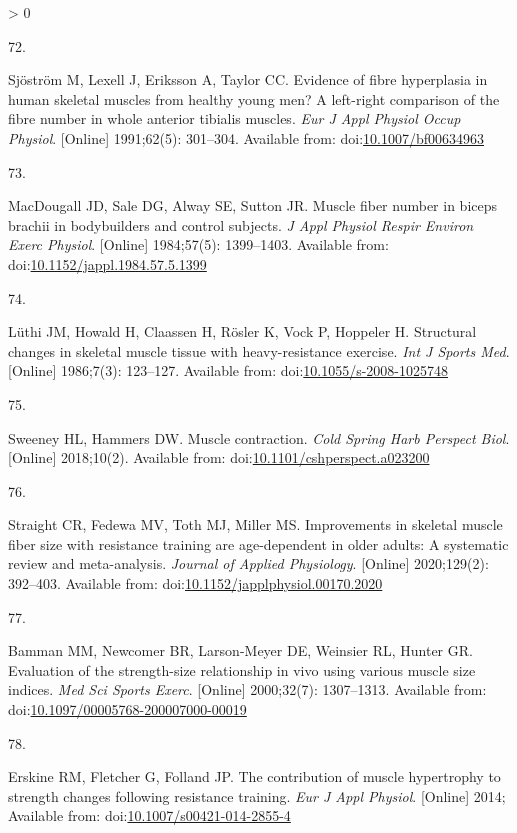 \documentclass[twoside,10pt]{gihclass} %
\newlength{\cslhangindent}
\newlength{\csllabelwidth}
\newenvironment{CSLReferences}[3] %
 {%
  \setlength{\parindent}{0pt}
  \ifodd #1 \everypar{\setlength{\hangindent}{\cslhangindent}}\ignorespaces\fi
  \ifnum #2 > 0
  \setlength{\parskip}{#2\baselineskip}
  \fi
 }%
 {}
\newcommand{\CSLLeftMargin}[1]{\parbox[t]{\maxof{\widthof{#1}}{\csllabelwidth}}{#1}}
\newcommand{\CSLRightInline}[1]{\parbox[t]{\linewidth}{#1}}
\begin{document}
\begin{CSLReferences}{0}{0}
\leavevmode\hypertarget{ref-RN2742}{}%
\CSLLeftMargin{72. }
\CSLRightInline{Sjöström M, Lexell J, Eriksson A, Taylor CC. Evidence of fibre hyperplasia in human skeletal muscles from healthy young men? A left-right comparison of the fibre number in whole anterior tibialis muscles. \emph{Eur J Appl Physiol Occup Physiol}. {[}Online{]} 1991;62(5): 301--304. Available from: doi:\href{https://doi.org/10.1007/bf00634963}{10.1007/bf00634963}}

\leavevmode\hypertarget{ref-RN2754}{}%
\CSLLeftMargin{73. }
\CSLRightInline{MacDougall JD, Sale DG, Alway SE, Sutton JR. Muscle fiber number in biceps brachii in bodybuilders and control subjects. \emph{J Appl Physiol Respir Environ Exerc Physiol}. {[}Online{]} 1984;57(5): 1399--1403. Available from: doi:\href{https://doi.org/10.1152/jappl.1984.57.5.1399}{10.1152/jappl.1984.57.5.1399}}

\leavevmode\hypertarget{ref-RN2731}{}%
\CSLLeftMargin{74. }
\CSLRightInline{Lüthi JM, Howald H, Claassen H, Rösler K, Vock P, Hoppeler H. Structural changes in skeletal muscle tissue with heavy-resistance exercise. \emph{Int J Sports Med}. {[}Online{]} 1986;7(3): 123--127. Available from: doi:\href{https://doi.org/10.1055/s-2008-1025748}{10.1055/s-2008-1025748}}

\leavevmode\hypertarget{ref-RN2756}{}%
\CSLLeftMargin{75. }
\CSLRightInline{Sweeney HL, Hammers DW. Muscle contraction. \emph{Cold Spring Harb Perspect Biol}. {[}Online{]} 2018;10(2). Available from: doi:\href{https://doi.org/10.1101/cshperspect.a023200}{10.1101/cshperspect.a023200}}

\leavevmode\hypertarget{ref-RN2669}{}%
\CSLLeftMargin{76. }
\CSLRightInline{Straight CR, Fedewa MV, Toth MJ, Miller MS. Improvements in skeletal muscle fiber size with resistance training are age-dependent in older adults: A systematic review and meta-analysis. \emph{Journal of Applied Physiology}. {[}Online{]} 2020;129(2): 392--403. Available from: doi:\href{https://doi.org/10.1152/japplphysiol.00170.2020}{10.1152/japplphysiol.00170.2020}}

\leavevmode\hypertarget{ref-RN2758}{}%
\CSLLeftMargin{77. }
\CSLRightInline{Bamman MM, Newcomer BR, Larson-Meyer DE, Weinsier RL, Hunter GR. Evaluation of the strength-size relationship in vivo using various muscle size indices. \emph{Med Sci Sports Exerc}. {[}Online{]} 2000;32(7): 1307--1313. Available from: doi:\href{https://doi.org/10.1097/00005768-200007000-00019}{10.1097/00005768-200007000-00019}}

\leavevmode\hypertarget{ref-RN1142}{}%
\CSLLeftMargin{78. }
\CSLRightInline{Erskine RM, Fletcher G, Folland JP. The contribution of muscle hypertrophy to strength changes following resistance training. \emph{Eur J Appl Physiol}. {[}Online{]} 2014; Available from: doi:\href{https://doi.org/10.1007/s00421-014-2855-4}{10.1007/s00421-014-2855-4}}


\end{CSLReferences}
\end{document}
